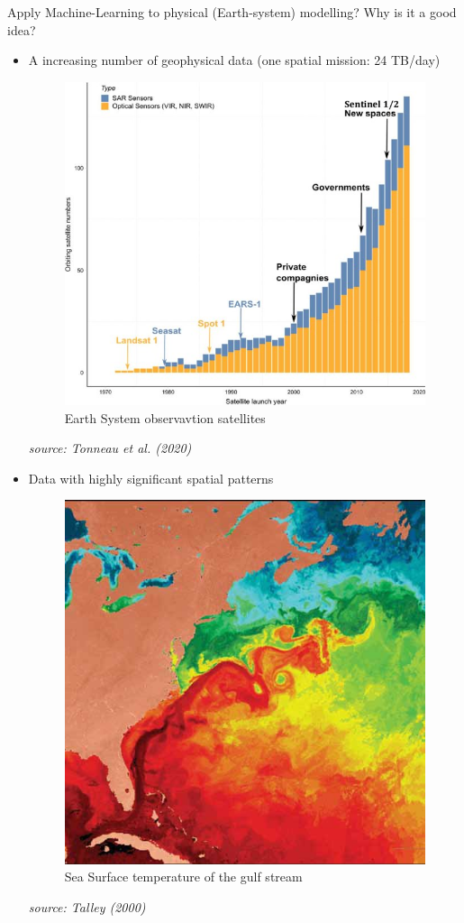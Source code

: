 \documentclass[handout]{beamer}
\newcommand{\rref}[1][]{\hfill{\scriptsize\textit{#1}}}
\begin{document}
\begin{frame}{Apply Machine-Learning to physical (Earth-system) modelling?}
\alert{Why is it a good idea?}
    \begin{itemize}
        \item A increasing number of geophysical data (one spatial mission: 24 TB/day)
           {
        \begin{figure}
\includegraphics[width=.5\textwidth]{fig/L1/sat-eso.jpeg}
\caption*{Earth System observavtion satellites}
\end{figure}
\rref[source: Tonneau et al. (2020)]
}
        \item <2->Data with highly significant spatial patterns
                   {
        \begin{figure}
\includegraphics[width=.36\textwidth]{fig/L1/Satellite-image-of-sea-surface-temperature-showing-the-gulf-Stream-and-large-rings-and_W640.jpg}
\caption*{Sea Surface temperature of the gulf stream}
\end{figure}
\rref[source: Talley (2000)]
}
    \end{itemize}
\end{frame}
\end{document}
